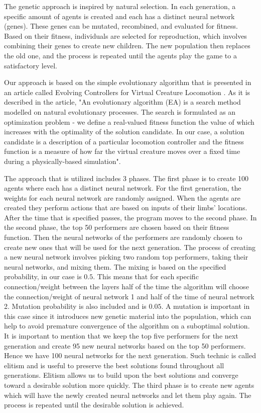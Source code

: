 \documentclass[letterpaper]{article} %
\begin{document}
The genetic approach is inspired by natural selection. In each generation, a specific amount of agents is created and each has a distinct neural network (genes). These genes can be mutated, recombined, and evaluated for fitness. Based on their fitness, individuals are selected for reproduction, which involves combining their genes to create new children. The new population then replaces the old one, and the process is repeated until the agents play the game to a satisfactory level. 
\par Our approach is based on the simple evolutionary algorithm that is presented in an article called Evolving Controllers for Virtual Creature Locomotion \cite{sanders_lobb_riddle_2003}. As it is described in the article, "An evolutionary algorithm (EA) is a search method modelled on natural evolutionary processes. The search is formulated as an optimization problem - we define a real-valued fitness function the value of which increases with the optimality of the solution candidate. In our case, a solution candidate is a description of a particular locomotion controller and the fitness function is a measure of how far the virtual creature moves over a fixed time during a physically-based simulation"\cite{sanders_lobb_riddle_2003}.
\par The approach that is utilized includes 3 phases. The first phase is to create 100 agents where each has a distinct neural network. For the first generation, the weights for each neural network are randomly assigned. When the agents are created they perform actions that are based on inputs of their limbs' locations. After the time that is specified passes, the program moves to the second phase. In the second phase, the top 50 performers are chosen based on their fitness function. Then the neural networks of the performers are randomly chosen to create new ones that will be used for the next generation. The process of creating a new neural network involves picking two random top performers, taking their neural networks, and mixing them. The mixing is based on the specified probability, in our case is $0.5$. This means that for each specific connection/weight between the layers half of the time the algorithm will choose the connection/weight of neural network 1 and half of the time of neural network 2. Mutation probability is also included and is $0.05$. A mutation is important in this case since it introduces new genetic material into the population, which can help to avoid premature convergence of the algorithm on a suboptimal solution. It is important to mention that we keep the top five performers for the next generation and create 95 new neural networks based on the top 50 performers. Hence we have 100 neural networks for the next generation. Such technic is called elitism and is useful to preserve the best solutions found throughout all generations. Elitism allows us to build upon the best solutions and converge toward a desirable solution more quickly. The third phase is to create new agents which will have the newly created neural networks and let them play again. The process is repeated until the desirable solution is achieved.
\end{document}
